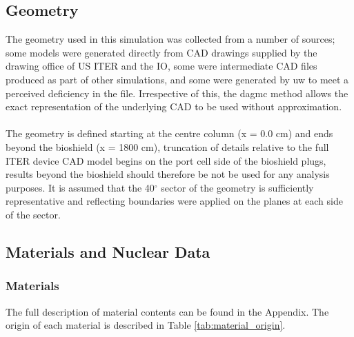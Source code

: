 \documentclass[12pt]{article}
\begin{document}
\subsection{Geometry}
The geometry used in this simulation was collected from a number of sources;
some models were generated directly from CAD drawings supplied by the
drawing office of US ITER and the IO, some were intermediate CAD files produced
as part of other simulations, and some were generated by \gls{uw} to meet a
perceived deficiency in the file. Irrespective of this, the \gls{dagmc} method
allows the exact representation of the underlying CAD to be used without
approximation.
\\
\\
The geometry is defined starting at the centre column (x = 0.0 cm) and ends
beyond the bioshield (x = 1800 cm), truncation of details relative to the full
ITER device CAD model begins on the port cell side of the bioshield plugs,
results beyond the bioshield should therefore be not be used for any
analysis purposes.  It is assumed that the 40$^{\circ}$ sector of the geometry
is sufficiently representative and reflecting boundaries were applied on the
planes at each side of the sector.

\subsection{Materials and Nuclear Data}
\subsubsection{Materials}
The full description of material contents can be found in the Appendix. The 
origin of each material is described in Table \ref{tab:material_origin}. 
\end{document}
